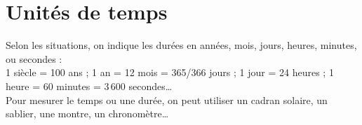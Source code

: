 \section{Unités de temps}

Selon les situations, on indique les durées en années, mois, jours, heures, minutes, ou secondes : \\
1 siècle = 100 ans ; 1 an = 12 mois = 365/366 jours ; 1 jour = 24 heures ; 1 heure = 60 minutes = 3\,600 secondes\dots \\
Pour mesurer le temps ou une durée, on peut utiliser un cadran solaire, un sablier, une montre, un chronomètre\dots

